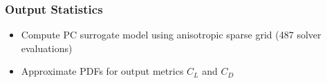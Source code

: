 \documentclass[9pt]{beamer}
\begin{document}
\begin{frame}
\frametitle{Output Statistics}
\label{sec-4-4}

\vspace*{-0.0cm}\begin{figure}
\end{figure}
\begin{itemize}
\item Compute PC surrogate model using anisotropic sparse grid (487 solver
  evaluations)
\item Approximate PDFs for output metrics $C_L$ and $C_D$
\end{itemize}
\end{frame}
\end{document}
